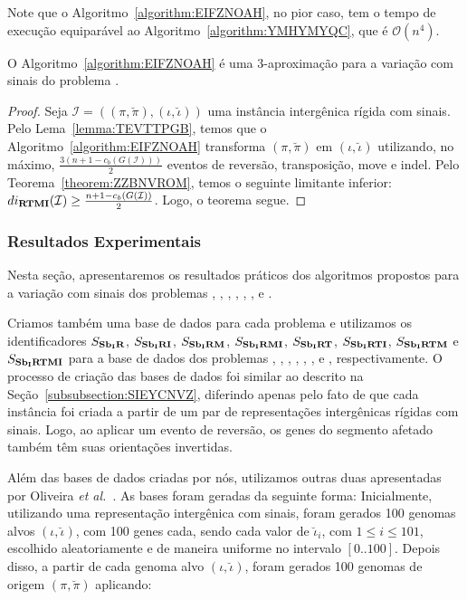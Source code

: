 Note que o Algoritmo~\ref{algorithm:EIFZNOAH}, no pior caso, tem o tempo de execução equiparável ao Algoritmo~\ref{algorithm:YMHYMYQC}, que é $\mathcal{O}(n^4)$.

\begin{theorem}\label{theorem:ZQMAXKGA}
O Algoritmo~\ref{algorithm:EIFZNOAH} é uma $3$-aproximação para a variação com sinais do problema \SbIRTMI{}.
\end{theorem}
\begin{proof}
Seja $\mathcal{I} = ((\pi,\breve\pi),(\iota,\breve\iota))$ uma instância intergênica rígida com sinais. Pelo Lema~\ref{lemma:TEVTTPGB}, temos que o Algoritmo~\ref{algorithm:EIFZNOAH} transforma $(\pi,\breve\pi)$ em $(\iota,\breve\iota)$ utilizando, no máximo, $\frac{3(n+1 - c_b(G(\mathcal{I})))}{2}$ eventos de reversão, transposição, move e indel. Pelo Teorema~\ref{theorem:ZZBNVROM}, temos o seguinte limitante inferior: $di_{\textbf{RTMI}}(\mathcal{I}) \ge\frac{{n + 1} - c_b(G(\mathcal{I}))}{2}$. Logo, o teorema segue.
\end{proof}

\subsubsection{Resultados Experimentais}

Nesta seção, apresentaremos os resultados práticos dos algoritmos propostos para a variação com sinais dos problemas \SbIR{}, \SbIRI{}, \SbIRM{}, \SbIRMI{}, \SbIRT{}, \SbIRTI{}, \SbIRTM{} e \SbIRTMI{}.

Criamos também uma base de dados para cada problema e utilizamos os identificadores $S_{\textbf{Sb\textsubscript{I}R}}{}$, $S_{\textbf{Sb\textsubscript{I}RI}}{}$, $S_{\textbf{Sb\textsubscript{I}RM}}{}$, $S_{\textbf{Sb\textsubscript{I}RMI}}{}$, $S_{\textbf{Sb\textsubscript{I}RT}}{}$, $S_{\textbf{Sb\textsubscript{I}RTI}}{}$, $S_{\textbf{Sb\textsubscript{I}RTM}}{}$ e $S_{\textbf{Sb\textsubscript{I}RTMI}}{}$ para a base de dados dos problemas \SbIR{}, \SbIRI{}, \SbIRM{}, \SbIRMI{}, \SbIRT{}, \SbIRTI{}, \SbIRTM{} e \SbIRTMI{}, respectivamente. O processo de criação das bases de dados foi similar ao descrito na Seção~\ref{subsubsection:SIEYCNVZ}, diferindo apenas pelo fato de que cada instância foi criada a partir de um par de representações intergênicas rígidas com sinais. Logo, ao aplicar um evento de reversão, os genes do segmento afetado também têm suas orientações invertidas.

Além das bases de dados criadas por nós, utilizamos outras duas apresentadas por Oliveira \textit{et al.}~\cite{2021a-oliveira-etal}. As bases foram geradas da seguinte forma: Inicialmente, utilizando uma representação  intergênica com sinais, foram gerados 100 genomas alvos $(\iota,\breve\iota)$, com 100 genes cada, sendo cada valor de $\breve\iota_i$, com $1 \le i \le 101$, escolhido aleatoriamente e de maneira uniforme no intervalo $[0..100]$. Depois disso, a partir de cada genoma alvo $(\iota,\breve\iota)$, foram gerados 100 genomas de origem $(\pi,\breve\pi)$ aplicando:

